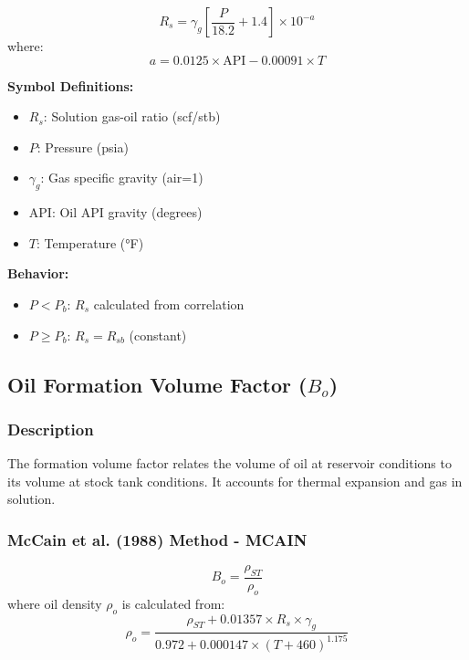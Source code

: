 \documentclass[11pt,a4paper]{article}
\newcommand{\symitem}[2]{\item \textbf{#1}: #2}
\begin{document}
\begin{tcolorbox}[colback=formulabox,colframe=black!75]
\begin{equation}
R_s = \gamma_g \left[ \frac{P}{18.2} + 1.4 \right] \times 10^{-a}
\end{equation}
where:
\begin{equation}
a = 0.0125 \times \text{API} - 0.00091 \times T
\end{equation}
\end{tcolorbox}

\textbf{Symbol Definitions:}
\begin{itemize}[leftmargin=2cm]
\symitem{$R_s$}{Solution gas-oil ratio (scf/stb)}
\symitem{$P$}{Pressure (psia)}
\symitem{$\gamma_g$}{Gas specific gravity (air=1)}
\symitem{$\text{API}$}{Oil API gravity (degrees)}
\symitem{$T$}{Temperature (°F)}
\end{itemize}

\textbf{Behavior:}
\begin{itemize}
\item $P < P_b$: $R_s$ calculated from correlation
\item $P \geq P_b$: $R_s = R_{sb}$ (constant)
\end{itemize}

\subsection{Oil Formation Volume Factor ($B_o$)}

\subsubsection{Description}
The formation volume factor relates the volume of oil at reservoir conditions to its volume at stock tank conditions. It accounts for thermal expansion and gas in solution.

\subsubsection{McCain et al. (1988) Method - MCAIN}

\begin{tcolorbox}[colback=formulabox,colframe=black!75]
\begin{equation}
B_o = \frac{\rho_{ST}}{\rho_o}
\end{equation}
where oil density $\rho_o$ is calculated from:
\begin{equation}
\rho_o = \frac{\rho_{ST} + 0.01357 \times R_s \times \gamma_g}{0.972 + 0.000147 \times (T+460)^{1.175}}
\end{equation}
\end{tcolorbox}
\end{document}
